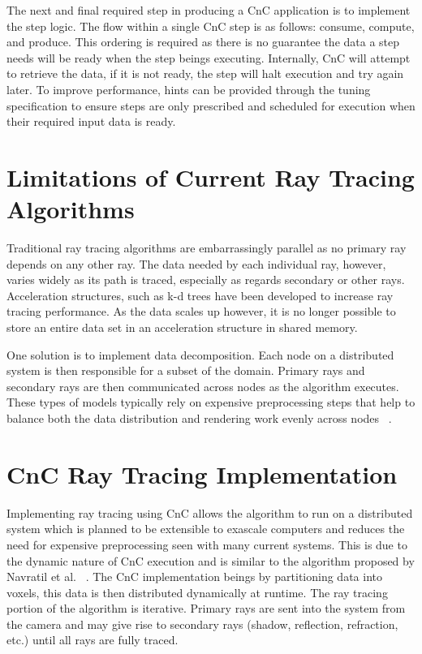 \documentclass{vgtc}                          %
\begin{document}
The next and final required step in producing a CnC application is to implement the step logic.  The flow within a single CnC step is as follows: consume, compute, and produce.  This ordering is required as there is no guarantee the data a step needs will be ready when the step beings executing.  Internally, CnC will attempt to retrieve the data, if it is not ready, the step will halt execution and try again later.  To improve performance, hints can be provided through the tuning specification to ensure steps are only prescribed and scheduled for execution when their required input data is ready.

\section{Limitations of Current Ray Tracing Algorithms}

Traditional ray tracing algorithms are embarrassingly parallel as no
primary ray depends on any other ray. The data needed by each
individual ray, however, varies widely as its path is traced,
especially as regards secondary or other rays. Acceleration
structures, such as k-d trees have been developed to increase ray
tracing performance. As the data scales up however, it is no longer
possible to store an entire data set in an acceleration structure in
shared memory.

One solution is to implement data decomposition. Each node on a
distributed system is then responsible for a subset of the domain.
Primary rays and secondary rays are then communicated across nodes as
the algorithm executes. These types of models typically rely on
expensive preprocessing steps that help to balance both the data
distribution and rendering work evenly across nodes
~\cite{navratil2014dynamic}.

\section{CnC Ray Tracing Implementation}

Implementing ray tracing using CnC allows the algorithm to run on a
distributed system which is planned to be extensible to exascale
computers and reduces the need for expensive preprocessing seen with
many current systems. This is due to the dynamic nature of CnC
execution and is similar to the algorithm proposed by Navratil et al.
~\cite{navratil2014dynamic}. The CnC implementation beings by
partitioning data into voxels, this data is then distributed
dynamically at runtime.
The ray tracing portion of the algorithm is
iterative. Primary rays are sent into the system from the camera and
may give rise to secondary rays (shadow, reflection, refraction, etc.)
until all rays are fully traced.
\end{document}
